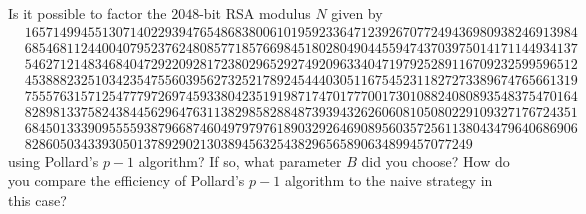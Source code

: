\begin{exercise}
    Is it possible to factor the $2048$-bit RSA modulus $N$ given by 
    \begin{align*}
        & 1657149945513071402293947654868380061019592336471239267077249436980938246913984 \\
        & 6854681124400407952376248085771857669845180280490445594743703975014171144934137 \\
        & 5462712148346840472922092817238029652927492096334047197925289116709232599596512 \\
        & 4538882325103423547556039562732521789245444030511675452311827273389674765661319 \\ 
        & 7555763157125477797269745933804235191987174701777001730108824080893548375470164 \\ 
        & 8289813375824384456296476311382985828848739394326260608105080229109327176724351 \\ 
        & 6845013339095555938796687460497979761890329264690895603572561138043479640686906 \\ 
        & 8286050343393050137892902130389456325438296565890634899457077249
    \end{align*}
    using Pollard's $p-1$ algorithm? If so, what parameter $B$ did you choose? 
    How do you compare the efficiency of Pollard's $p-1$ algorithm to the 
    naive strategy in this case?
\end{exercise}
